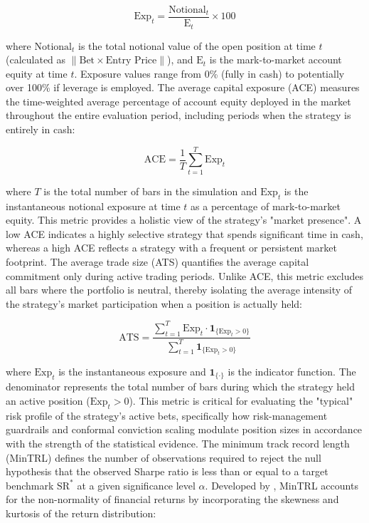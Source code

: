 \documentclass[12pt, a4paper]{article}
\begin{document}
\begin{equation}
    \text{Exp}_t = \frac{\text{Notional}_t}{\text{E}_t} \times 100
    \label{eq:exposure}
\end{equation}

where \(\text{Notional}_t\) is the total notional value of the open position at time \(t\) (calculated as $\|\text{Bet} \times \text{Entry Price}\|$), and 
\(\text{E}_t\) is the mark-to-market account equity at time \(t\). Exposure values range from 0\% (fully in cash) to potentially over 100\% if leverage is employed.
The average capital exposure (ACE) measures the time-weighted average percentage of account equity deployed in the market throughout the entire evaluation period, 
including periods when the strategy is entirely in cash:

\begin{equation}
    \text{ACE} = \frac{1}{T} \sum_{t=1}^{T} \text{Exp}_t
    \label{eq:avg_capital_exposure}
\end{equation}

where \(T\) is the total number of bars in the simulation and \(\text{Exp}_t\) is the instantaneous notional exposure at time \(t\) as a percentage of mark-to-market equity. 
This metric provides a holistic view of the strategy's "market presence". A low ACE indicates a highly selective strategy that spends significant time in cash, whereas a high ACE reflects 
a strategy with a frequent or persistent market footprint.
The average trade size (ATS) quantifies the average capital commitment only during active trading periods. Unlike ACE, this metric excludes all bars where the portfolio is neutral, 
thereby isolating the average intensity of the strategy's market participation when a position is actually held:

\begin{equation}
    \text{ATS} = \frac{\sum_{t=1}^{T} \text{Exp}_t \cdot \mathbf{1}_{\{\text{Exp}_t > 0\}}}{\sum_{t=1}^{T} \mathbf{1}_{\{\text{Exp}_t > 0\}}}
    \label{eq:avg_trade_size}
\end{equation}

where \(\text{Exp}_t\) is the instantaneous exposure and \(\mathbf{1}_{\{\cdot\}}\) is the indicator function. The denominator represents the total number of bars during which the 
strategy held an active position (\(\text{Exp}_t > 0\)). This metric is critical for evaluating the "typical" risk profile of the strategy's active bets, 
specifically how risk-management guardrails and conformal conviction scaling modulate position sizes in accordance with the strength of the statistical evidence.
The minimum track record length (MinTRL) defines the number of observations required to reject the null hypothesis that the observed Sharpe ratio is less than or equal to a target 
benchmark \(\text{SR}^*\) at a given significance level \(\alpha\). Developed by \textcite[see Eq. 13]{bailey_sharpe_2012}, MinTRL accounts for the non-normality of financial returns by 
incorporating the skewness and kurtosis of the return distribution:
\end{document}
